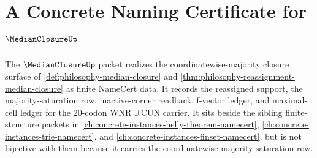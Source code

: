 \chapter{A Concrete Naming Certificate for $\MedianClosureUp$}
\label{ch:concrete-instances-median-closure-namecert}

The $\MedianClosureUp$ packet realizes the coordinatewise-majority closure surface of \autoref{def:philosophy-median-closure} and \autoref{thm:philosophy-reassignment-median-closure} as finite NameCert data. It records the reassigned support, the majority-saturation row, inactive-corner readback, f-vector ledger, and maximal-cell ledger for the $20$-codon $\mathrm{WNR}\cup\mathrm{CUN}$ carrier. It sits beside the sibling finite-structure packets in \autoref{ch:concrete-instances-helly-theorem-namecert}, \autoref{ch:concrete-instances-trie-namecert}, and \autoref{ch:concrete-instances-finset-namecert}, but is not bijective with them because it carries the coordinatewise-majority saturation row.


